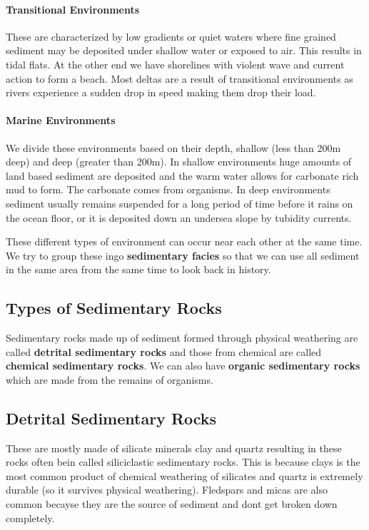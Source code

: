 \documentclass{article}
\begin{document}
 \paragraph{Transitional Environments} %
 \label{par:transitional_environments}
 These are characterized by low gradients or quiet waters where fine grained sediment may be deposited under shallow water or exposed to air. This results in tidal flats. At the other end we have shorelines with violent wave and current action to form a beach. Most deltas are a result of transitional environments as rivers experience a sudden drop in speed making them drop their load.

\paragraph{Marine Environments} %
\label{par:marine_environments}
We divide these environments based on their depth, shallow (less than 200m deep) and deep (greater than 200m). In shallow environments huge amounts of land based sediment are deposited and the warm water allows for carbonate rich mud to form. The carbonate comes from organisms. In deep environments sediment usually remains suspended for a long period of time before it rains on the ocean floor, or it is deposited down an undersea slope by tubidity currents.

These different types of environment can occur near each other at the same time. We try to group these ingo \textbf{sedimentary facies} so that we can use all sediment in the same area from the same time to look back in history.

\subsection*{Types of Sedimentary Rocks} %
\label{sub:types_of_sedimentary_rocks}
Sedimentary rocks made up of sediment formed through physical weathering are called \textbf{detrital sedimentary rocks} and those from chemical are called \textbf{chemical sedimentary rocks}. We can also have \textbf{organic sedimentary rocks} which are made from the remains of organisms.

\subsection*{Detrital Sedimentary Rocks} %
\label{sub:detrital_sedimentary_rocks}
These are mostly made of silicate minerals clay and quartz resulting in these rocks often bein called siliciclastic sedimentary rocks. This is because clays is the most common product of chemical weathering of silicates and quartz is extremely durable (so it survives physical weathering). Fledspars and micas are also common becayse they are the source of sediment and dont get broken down completely.
\end{document}

